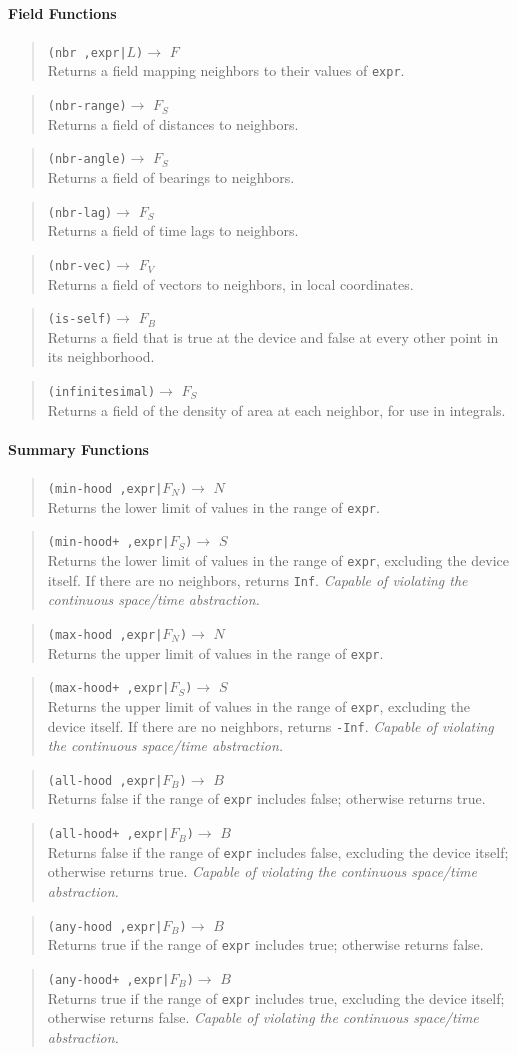 \documentclass{article}
\newcommand\violation{{\em Capable of violating the continuous
    space/time abstraction.}}
\newcommand\function[3]
{\begin{quote}{\tt #1}$\rightarrow$ \type{#2} \\ #3 \end{quote}}
\newcommand\type[1]{$#1$}
\newcommand\var[1]{{\tt #1}}
\begin{document}
\paragraph{Field Functions}

\function{(nbr ,expr|\type{L})}{F}{Returns a field mapping neighbors
  to their values of \var{expr}.}

\function{(nbr-range)}{F_S}{Returns a field of distances to neighbors.}
\function{(nbr-angle)}{F_S}{Returns a field of bearings to neighbors.}
\function{(nbr-lag)}{F_S}{Returns a field of time lags to neighbors.}
\function{(nbr-vec)}{F_V}{Returns a field of vectors to neighbors, in
  local coordinates.}
\function{(is-self)}{F_B}{Returns a field that is true at the device
  and false at every other point in its neighborhood.}

\function{(infinitesimal)}{F_S}{Returns a field of the density of
  area at each neighbor, for use in integrals.}

\paragraph{Summary Functions}

\function{(min-hood ,expr|\type{F_N})}{N}{Returns the lower limit of
  values in the range of \var{expr}.}
\function{(min-hood+ ,expr|\type{F_S})}{S}{Returns the lower limit of
  values in the range of \var{expr}, excluding the device itself.  
  If there are no neighbors, returns \var{Inf}. \violation{}}
\function{(max-hood ,expr|\type{F_N})}{N}{Returns the upper limit of
  values in the range of \var{expr}.}
\function{(max-hood+ ,expr|\type{F_S})}{S}{Returns the upper limit of
  values in the range of \var{expr}, excluding the device itself.  
  If there are no neighbors, returns \var{-Inf}. \violation{}}

\function{(all-hood ,expr|\type{F_B})}{B}{Returns false if the
  range of \var{expr} includes false; otherwise returns true.}
\function{(all-hood+ ,expr|\type{F_B})}{B}{Returns false if the range
  of \var{expr} includes false, excluding the device itself; otherwise
  returns true. \violation{}}
\function{(any-hood ,expr|\type{F_B})}{B}{Returns true if the
  range of \var{expr} includes true; otherwise returns false.}
\function{(any-hood+ ,expr|\type{F_B})}{B}{Returns true if the range
  of \var{expr} includes true, excluding the device itself; otherwise
  returns false. \violation{}}
\end{document}
